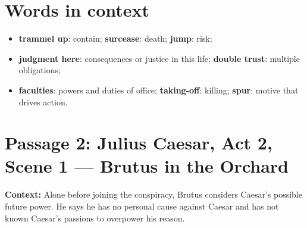 \documentclass[11pt]{article}
\begin{document}
\section*{Words in context}
\begin{itemize}
\item \textbf{trammel up}: contain; \textbf{surcease}: death; \textbf{jump}: risk;
\item \textbf{judgment here}: consequences or justice in this life; \textbf{double trust}: multiple obligations;
\item \textbf{faculties}: powers and duties of office; \textbf{taking-off}: killing; \textbf{spur}: motive that drives action.
\end{itemize}

\newpage
\section*{Passage 2: Julius Caesar, Act 2, Scene 1 --- Brutus in the Orchard}
\textbf{Context:} Alone before joining the conspiracy, Brutus considers Caesar's possible future power. He says he has no personal cause against Caesar and has not known Caesar's passions to overpower his reason.
\end{document}
